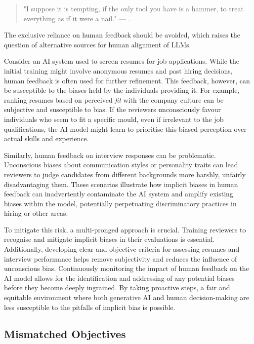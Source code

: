 \documentclass[12pt]{article}
\begin{document}
\begin{quote}
    "I suppose it is tempting, if the only tool you have is a hammer, to treat everything as if it were a nail." — \cite{maslow-1966}.
\end{quote}

The exclusive reliance on human feedback should be avoided, which raises the question of alternative sources for human alignment of LLMs.

Consider an AI system used to screen resumes for job applications. While the initial training might involve anonymous resumes and past hiring decisions, human feedback is often used for further refinement. This feedback, however, can be susceptible to the biases held by the individuals providing it. For example, ranking resumes based on perceived \textit{fit} with the company culture can be subjective and susceptible to bias. If the reviewers unconsciously favour individuals who seem to fit a specific mould, even if irrelevant to the job qualifications, the AI model might learn to prioritise this biased perception over actual skills and experience.

Similarly, human feedback on interview responses can be problematic. Unconscious biases about communication styles or personality traits can lead reviewers to judge candidates from different backgrounds more harshly, unfairly disadvantaging them. These scenarios illustrate how implicit biases in human feedback can inadvertently contaminate the AI system and amplify existing biases within the model, potentially perpetuating discriminatory practices in hiring or other areas.

To mitigate this risk, a multi-pronged approach is crucial. Training reviewers to recognise and mitigate implicit biases in their evaluations is essential. Additionally, developing clear and objective criteria for assessing resumes and interview performance helps remove subjectivity and reduces the influence of unconscious bias. Continuously monitoring the impact of human feedback on the AI model allows for the identification and addressing of any potential biases before they become deeply ingrained. By taking proactive steps, a fair and equitable environment where both generative AI and human decision-making are less susceptible to the pitfalls of implicit bias is possible.

\subsection{Mismatched Objectives} 
\end{document}
